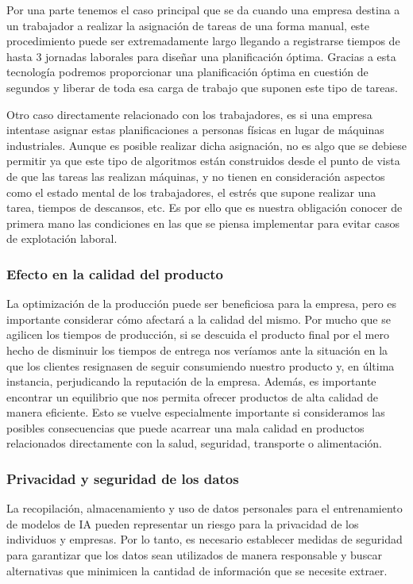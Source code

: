 Por una parte tenemos el caso principal que se da cuando una empresa destina a un 
trabajador a realizar la asignación de tareas de una forma manual, este procedimiento 
puede ser extremadamente largo llegando a registrarse tiempos de hasta 3 jornadas 
laborales para diseñar una planificación óptima. Gracias a esta tecnología podremos 
proporcionar una planificación óptima en cuestión de segundos y liberar de toda esa 
carga de trabajo que suponen este tipo de tareas.\medskip

Otro caso directamente relacionado con los trabajadores, es si una empresa intentase 
asignar estas planificaciones a personas físicas en lugar de máquinas industriales. 
Aunque es posible realizar dicha asignación, no es algo que se debiese permitir ya 
que este tipo de algoritmos están construidos desde el punto de vista de que las 
tareas las realizan máquinas, y no tienen en consideración aspectos como el estado 
mental de los trabajadores, el estrés que supone realizar una tarea, tiempos de 
descansos, etc. Es por ello que es nuestra obligación conocer de primera mano las 
condiciones en las que se piensa implementar para evitar casos de explotación laboral.


\subsubsection{Efecto en la calidad del producto}
La optimización de la producción puede ser beneficiosa para la empresa, pero es 
importante considerar cómo afectará a la calidad del mismo. Por mucho que se 
agilicen los tiempos de producción, si se descuida el producto final por el mero 
hecho de disminuir los tiempos de entrega nos veríamos ante la situación en la 
que los clientes resignasen de seguir consumiendo nuestro producto y, en última 
instancia, perjudicando la reputación de la empresa. Además, es importante encontrar 
un equilibrio que nos permita ofrecer productos de alta calidad de manera eficiente. 
Esto se vuelve especialmente importante si consideramos las posibles consecuencias 
que puede acarrear una mala calidad en productos relacionados directamente con la 
salud, seguridad, transporte o alimentación.

\subsubsection{Privacidad y seguridad de los datos}
La recopilación, almacenamiento y uso de datos personales para el entrenamiento de 
modelos de IA pueden representar un riesgo para la privacidad de los individuos y 
empresas. Por lo tanto, es necesario establecer medidas de seguridad para garantizar 
que los datos sean utilizados de manera responsable y buscar alternativas que minimicen 
la cantidad de información que se necesite extraer.\medskip

